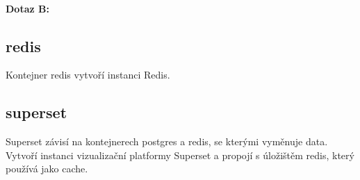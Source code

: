 \documentclass[10pt,a4paper,titlepage]{extarticle}
\begin{document}

\paragraph{Dotaz B:}


\subsection{redis}

Kontejner redis vytvoří instanci Redis.


\subsection{superset}

Superset závisí na kontejnerech postgres a redis, se kterými vyměnuje data. Vytvoří instanci vizualizační platformy Superset a propojí s úložištěm redis, který používá jako cache.
\end{document}
